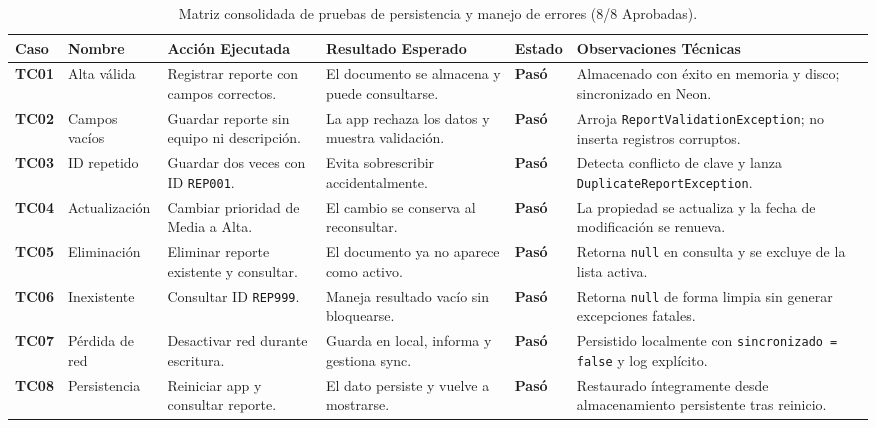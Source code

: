 \documentclass[11pt,a4paper]{article}
\begin{document}
\begin{table}[H]
\centering
\footnotesize
\renewcommand{\arraystretch}{1.2}
\setlength{\tabcolsep}{3.5pt}
\begin{tabularx}{\linewidth}{|>{\centering\arraybackslash}p{1.0cm}|>{\raggedright\arraybackslash}p{1.8cm}|>{\raggedright\arraybackslash}p{2.6cm}|>{\raggedright\arraybackslash}p{2.6cm}|>{\centering\arraybackslash}p{1.0cm}|X|}
\hline
\textbf{Caso} & \textbf{Nombre} & \textbf{Acción Ejecutada} & \textbf{Resultado Esperado} & \textbf{Estado} & \textbf{Observaciones Técnicas} \\
\hline
\textbf{TC01} & Alta válida & Registrar reporte con campos correctos. & El documento se almacena y puede consultarse. & \textbf{Pasó} & Almacenado con éxito en memoria y disco; sincronizado en Neon. \\
\hline
\textbf{TC02} & Campos vacíos & Guardar reporte sin equipo ni descripción. & La app rechaza los datos y muestra validación. & \textbf{Pasó} & Arroja \texttt{ReportValidationException}; no inserta registros corruptos. \\
\hline
\textbf{TC03} & ID repetido & Guardar dos veces con ID \texttt{REP001}. & Evita sobrescribir accidentalmente. & \textbf{Pasó} & Detecta conflicto de clave y lanza \texttt{DuplicateReportException}. \\
\hline
\textbf{TC04} & Actualización & Cambiar prioridad de Media a Alta. & El cambio se conserva al reconsultar. & \textbf{Pasó} & La propiedad se actualiza y la fecha de modificación se renueva. \\
\hline
\textbf{TC05} & Eliminación & Eliminar reporte existente y consultar. & El documento ya no aparece como activo. & \textbf{Pasó} & Retorna \texttt{null} en consulta y se excluye de la lista activa. \\
\hline
\textbf{TC06} & Inexistente & Consultar ID \texttt{REP999}. & Maneja resultado vacío sin bloquearse. & \textbf{Pasó} & Retorna \texttt{null} de forma limpia sin generar excepciones fatales. \\
\hline
\textbf{TC07} & Pérdida de red & Desactivar red durante escritura. & Guarda en local, informa y gestiona sync. & \textbf{Pasó} & Persistido localmente con \texttt{sincronizado = false} y log explícito. \\
\hline
\textbf{TC08} & Persistencia & Reiniciar app y consultar reporte. & El dato persiste y vuelve a mostrarse. & \textbf{Pasó} & Restaurado íntegramente desde almacenamiento persistente tras reinicio. \\
\hline
\end{tabularx}
\caption{Matriz consolidada de pruebas de persistencia y manejo de errores (8/8 Aprobadas).}
\label{tab:matriz_pruebas_db}
\end{table}
\end{document}
